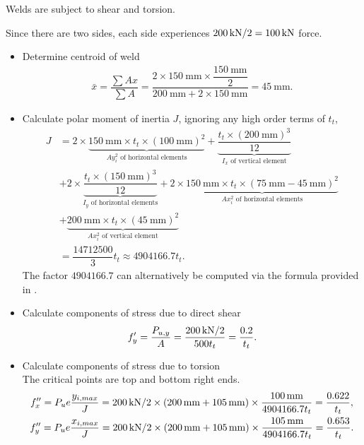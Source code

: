 \begin{solution}
Welds are subject to shear and torsion.

Since there are two sides, each side experiences $\SI{200}{\kilo\newton}/2=\SI{100}{\kilo\newton}$ force.
\begin{itemize}
\item Determine centroid of weld
\begin{gather*}
\bar{x}=\dfrac{\displaystyle\sum{}Ax}{\displaystyle\sum{}A}=\dfrac{2\times\SI{150}{\mm}\times\dfrac{\SI{150}{\mm}}{2}}{\SI{200}{\mm}+2\times\SI{150}{\mm}}=\SI{45}{\mm}.
\end{gather*}
\item Calculate polar moment of inertia $J$, ignoring any high order terms of $t_t$,
\begin{align*}
J&=2\times\underbrace{\SI{150}{\mm}\times{}t_t\times\left(\SI{100}{\mm}\right)^2}_\text{$Ay_i^2$ of horizontal elements}
+\underbrace{\dfrac{t_t\times\left(\SI{200}{\mm}\right)^3}{12}}_\text{$I_x$ of vertical element}\\
&+2\times\underbrace{\dfrac{t_t\times\left(\SI{150}{\mm}\right)^3}{12}}_\text{$I_y$ of horizontal elements}
+2\times\underbrace{\SI{150}{\mm}\times{}t_t\times\left(\SI{75}{\mm}-\SI{45}{\mm}\right)^2}_\text{$Ax_i^2$ of horizontal elements}\\
&+\underbrace{\SI{200}{\mm}\times{}t_t\times\left(\SI{45}{\mm}\right)^2}_\text{$Ax_i^2$ of vertical element}\\
&=\dfrac{14712500}{3}t_t\approx4904166.7t_t.
\end{align*}
The factor $4904166.7$ can alternatively be computed via the formula provided in .
\item Calculate components of stress due to direct shear
\begin{gather*}
f'_y=\dfrac{P_{u,y}}{A}=\dfrac{\SI{200}{\kilo\newton}/2}{500t_t}=\dfrac{0.2}{t_t}.
\end{gather*}
\item Calculate components of stress due to torsion\\
The critical points are top and bottom right ends.
\begin{gather*}
f''_x=P_ue\dfrac{y_{i,max}}{J}=\SI{200}{\kilo\newton}/2\times\left(\SI{200}{\milli\meter}+\SI{105}{\milli\meter}\right)\times\dfrac{\SI{100}{\milli\meter}}{4904166.7t_t}=\dfrac{0.622}{t_t},\\
f''_y=P_ue\dfrac{x_{i,max}}{J}=\SI{200}{\kilo\newton}/2\times\left(\SI{200}{\milli\meter}+\SI{105}{\milli\meter}\right)\times\dfrac{\SI{105}{\milli\meter}}{4904166.7t_t}=\dfrac{0.653}{t_t}.
\end{gather*}

\end{itemize}
\end{solution}

